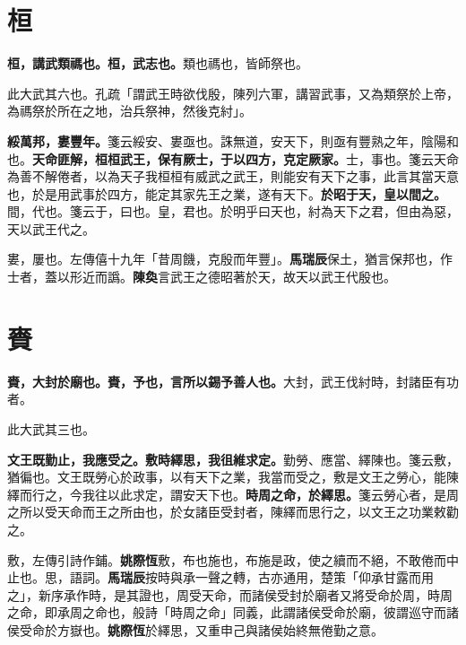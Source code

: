 \section{桓}


\textbf{桓，講武類禡也。桓，武志也。}{\footnotesize 類也禡也，皆師祭也。}

\begin{quoting}此大武其六也。孔疏「謂武王時欲伐殷，陳列六軍，講習武事，又為類祭於上帝，為禡祭於所在之地，治兵祭神，然後克紂」。\end{quoting}

\textbf{綏萬邦，婁豐年。}{\footnotesize 箋云綏安、婁亟也。誅無道，安天下，則亟有豐熟之年，陰陽和也。}\textbf{天命匪解，桓桓武王，保有厥士，于以四方，克定厥家。}{\footnotesize 士，事也。箋云天命為善不解倦者，以為天子我桓桓有威武之武王，則能安有天下之事，此言其當天意也，於是用武事於四方，能定其家先王之業，遂有天下。}\textbf{於昭于天，皇以間之。}{\footnotesize 間，代也。箋云于，曰也。皇，君也。於明乎曰天也，紂為天下之君，但由為惡，天以武王代之。}

\begin{quoting}婁，屢也。左傳僖十九年「昔周饑，克殷而年豐」。\textbf{馬瑞辰}保土，猶言保邦也，作士者，蓋以形近而譌。\textbf{陳奐}言武王之德昭著於天，故天以武王代殷也。\end{quoting}

\section{賚}


\textbf{賚，大封於廟也。賚，予也，言所以錫予善人也。}{\footnotesize 大封，武王伐紂時，封諸臣有功者。}

\begin{quoting}此大武其三也。\end{quoting}

\textbf{文王既勤止，我應受之。敷時繹思，我徂維求定。}{\footnotesize 勤勞、應當、繹陳也。箋云敷，猶徧也。文王既勞心於政事，以有天下之業，我當而受之，敷是文王之勞心，能陳繹而行之，今我往以此求定，謂安天下也。}\textbf{時周之命，於繹思。}{\footnotesize 箋云勞心者，是周之所以受天命而王之所由也，於女諸臣受封者，陳繹而思行之，以文王之功業敕勸之。}

\begin{quoting}敷，左傳引詩作鋪。\textbf{姚際恆}敷，布也施也，布施是政，使之續而不絕，不敢倦而中止也。思，語詞。\textbf{馬瑞辰}按時與承一聲之轉，古亦通用，楚策「仰承甘露而用之」，新序承作時，是其證也，周受天命，而諸侯受封於廟者又將受命於周，時周之命，即承周之命也，般詩「時周之命」同義，此謂諸侯受命於廟，彼謂巡守而諸侯受命於方嶽也。\textbf{姚際恆}於繹思，又重申己與諸侯始終無倦勤之意。\end{quoting}

